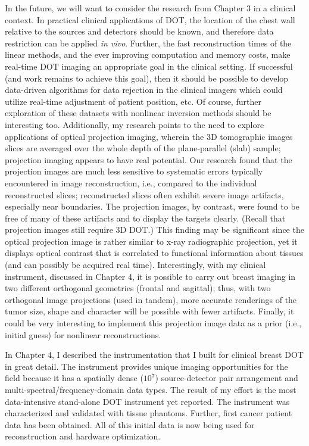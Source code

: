 In the future, we will want to consider the research from Chapter 3 in a clinical context. In practical clinical applications of DOT, the location of the chest wall relative to the sources and detectors should be known, and therefore data restriction can be applied {\em in vivo}. Further, the fast reconstruction times of the linear methods, and the ever improving computation and memory costs, make real-time DOT imaging an appropriate goal in the clinical setting. If successful (and work remains to achieve this goal), then it should be possible to develop data-driven algorithms for data rejection in the clinical imagers which could utilize real-time adjustment of patient position, etc. Of course, further exploration of these datasets with nonlinear inversion methods should be interesting too. Additionally, my research points to the need to explore applications of optical projection imaging, wherein the 3D tomographic images slices are averaged over the whole depth of the plane-parallel (slab) sample; projection imaging appears to have real potential. Our research found that the projection images are much less sensitive to systematic errors typically encountered in image reconstruction, i.e., compared to the individual reconstructed slices; reconstructed slices often exhibit severe image artifacts, especially near boundaries. The projection images, by contrast, were found to be free of many of these artifacts and to display the targets clearly. (Recall that projection images still require 3D DOT.) This finding may be significant since the optical projection image is rather similar to x-ray radiographic projection, yet it displays optical contrast that is correlated to functional information about tissues (and can possibly be acquired real time). Interestingly, with my clinical instrument, discussed in Chapter 4, it is possible to carry out breast imaging in two different orthogonal geometries (frontal and sagittal); thus, with two orthogonal image projections (used in tandem), more accurate renderings of the tumor size, shape and character will be possible with fewer artifacts. Finally, it could be very interesting to implement this projection image data as a prior (i.e., initial guess) for nonlinear reconstructions.

In Chapter 4, I described the instrumentation that I built for clinical breast DOT in great detail. The instrument provides unique imaging opportunities for the field because it has a spatially dense ($10^7$) source-detector pair arrangement and multi-spectral/frequency-domain data types. The result of my effort is the most data-intensive stand-alone DOT instrument yet reported. The instrument was characterized and validated with tissue phantoms. Further, first cancer patient data has been obtained. All of this initial data is now being used for reconstruction and hardware optimization.

